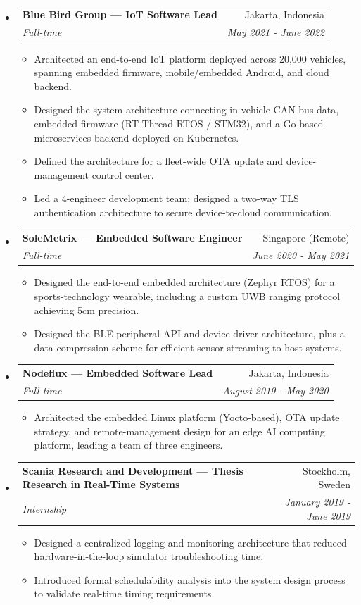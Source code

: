 \documentclass[letterpaper,9pt]{article}
\makeatletter
\newcommand{\resitem}[1]{\item #1 \vspace{-2pt}}
\newcommand{\ressubheading}[4]{
\begin{tabular*}{7.0in}{l@{\cftdotfill{\cftsecdotsep}\extracolsep{\fill}}r}
		\textbf{#1} & #2 \\
        \textit{#3} & \textit{#4} \\
\end{tabular*}\vspace{-6.3pt}}
\makeatother
\begin{document}
\begin{itemize}
  \item 
    \ressubheading{Blue Bird Group --- IoT Software Lead}{Jakarta, Indonesia}{Full-time}{May 2021 - June 2022}
    \begin{itemize}
      \resitem{Architected an end-to-end IoT platform deployed across 20,000 vehicles, spanning embedded firmware, mobile/embedded Android, and cloud backend.}
      \resitem{Designed the system architecture connecting in-vehicle CAN bus data, embedded firmware (RT-Thread RTOS / STM32), and a Go-based microservices backend deployed on Kubernetes.}
      \resitem{Defined the architecture for a fleet-wide OTA update and device-management control center.}
      \resitem{Led a 4-engineer development team; designed a two-way TLS authentication architecture to secure device-to-cloud communication.}
    \end{itemize}
  
  \item
        \ressubheading{SoleMetrix --- Embedded Software Engineer}{Singapore (Remote)}{Full-time}{June 2020 - May 2021}
        \begin{itemize}
          \resitem{Designed the end-to-end embedded architecture (Zephyr RTOS) for a sports-technology wearable, including a custom UWB ranging protocol achieving 5cm precision.}
          \resitem{Designed the BLE peripheral API and device driver architecture, plus a data-compression scheme for efficient sensor streaming to host systems.}
        \end{itemize}

  \item
        \ressubheading{Nodeflux --- Embedded Software Lead}{Jakarta, Indonesia}{Full-time}{August 2019 - May 2020}
        \begin{itemize}
          \resitem{Architected the embedded Linux platform (Yocto-based), OTA update strategy, and remote-management design for an edge AI computing platform, leading a team of three engineers.}
        \end{itemize}

  \item
        \ressubheading{Scania Research and Development --- Thesis Research in Real-Time Systems}{Stockholm, Sweden}{Internship}{January 2019 - June 2019}
        \begin{itemize}
          \resitem{Designed a centralized logging and monitoring architecture that reduced hardware-in-the-loop simulator troubleshooting time.}
          \resitem{Introduced formal schedulability analysis into the system design process to validate real-time timing requirements.}
        \end{itemize}


\end{itemize}
\end{document}
